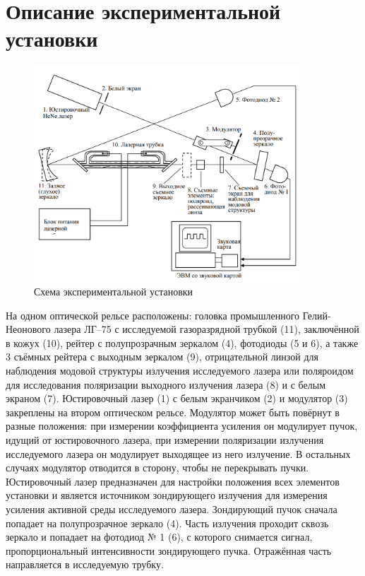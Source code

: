 \section*{Описание экспериментальной установки}

\begin{figure}[H]
	\centering
	\includegraphics[width=0.9\textwidth]{../Изображения/Схема установки.png}
	\caption{Схема экспериментальной установки}
\end{figure}

На одном оптической рельсе расположены: головка промышленного Гелий-Неонового лазера ЛГ–75 с исследуемой газоразрядной трубкой (11), заключённой в кожух (10), рейтер с полупрозрачным зеркалом (4), фотодиоды (5 и 6), а также 3 съёмных рейтера с выходным зеркалом (9), отрицательной линзой для наблюдения модовой структуры излучения исследуемого лазера или поляроидом для исследования поляризации выходного излучения лазера (8) и с белым экраном (7). Юстировочный лазер (1) с белым экранчиком (2) и модулятор (3) закреплены на втором оптическом рельсе. Модулятор может быть повёрнут в разные положения: при измерении коэффициента усиления он модулирует пучок, идущий от юстировочного лазера, при измерении поляризации излучения исследуемого лазера он модулирует выходящее из него излучение. В остальных случаях модулятор отводится в сторону, чтобы не перекрывать пучки. Юстировочный лазер предназначен для настройки положения всех элементов установки и является источником зондирующего излучения для измерения усиления активной среды исследуемого лазера. Зондирующий пучок сначала попадает на полупрозрачное зеркало (4). Часть излучения проходит сквозь зеркало и попадает на фотодиод № 1 (6), с которого снимается сигнал, пропорциональный интенсивности зондирующего пучка. Отражённая часть направляется в исследуемую трубку.